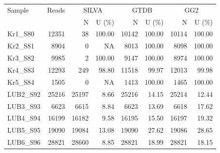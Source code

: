 \begin{tabular}{lrrrrrrr}
\hline
Sample & Reads & \multicolumn{2}{c}{SILVA} & \multicolumn{2}{c}{GTDB} & \multicolumn{2}{c}{GG2} \\
 & & N & U (\%) & N & U (\%) & N & U (\%) \\
\hline
Kr1\_S80 & 12351 & 38 & 100.00 & 10142 & 100.00 & 10114 & 100.00 \\
Kr2\_S81 & 8904 & 0 & NA & 8013 & 100.00 & 8098 & 100.00 \\
Kr3\_S82 & 9985 & 2 & 100.00 & 9147 & 100.00 & 8974 & 100.00 \\
Kr4\_S83 & 12293 & 249 & 98.80 & 11518 & 99.97 & 12013 & 99.98 \\
Kr5\_S84 & 1505 & 0 & NA & 1413 & 100.00 & 1465 & 100.00 \\
LUB2\_S92 & 25216 & 25197 & 8.66 & 25216 & 14.15 & 25214 & 12.44 \\
LUB3\_S93 & 6623 & 6615 & 8.84 & 6623 & 13.69 & 6618 & 17.62 \\
LUB4\_S94 & 16199 & 16182 & 9.58 & 16195 & 15.50 & 16197 & 19.32 \\
LUB5\_S95 & 19090 & 19084 & 13.08 & 19090 & 27.62 & 19086 & 28.65 \\
LUB6\_S96 & 28821 & 28660 & 8.85 & 28821 & 18.99 & 28821 & 18.15 \\
\hline
\end{tabular}
